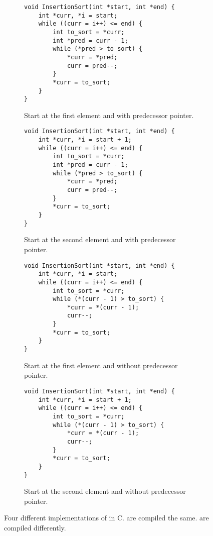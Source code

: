 \begin{figure}
	\lstset{basicstyle=\ttfamily\small}
	\def\codewidth{0.47\linewidth}
	\begin{subfigure}{\codewidth}
		\begin{lstlisting}
void InsertionSort(int *start, int *end) {
	int *curr, *i = start;
	while ((curr = i++) <= end) {
		int to_sort = *curr;
		int *pred = curr - 1;
		while (*pred > to_sort) {
			*curr = *pred;
			curr = pred--;
		}
		*curr = to_sort;
	}
}
		\end{lstlisting}
		\caption{
			Start at the first element and with predecessor pointer.
		}
		\label{fig:insertion:impl:pred_first}
	\end{subfigure}
	\hfill
	\begin{subfigure}{\codewidth}
		\begin{lstlisting}
void InsertionSort(int *start, int *end) {
	int *curr, *i = start + 1;
	while ((curr = i++) <= end) {
		int to_sort = *curr;
		int *pred = curr - 1;
		while (*pred > to_sort) {
			*curr = *pred;
			curr = pred--;
		}
		*curr = to_sort;
	}
}
		\end{lstlisting}
		\caption{
			Start at the second element and with predecessor pointer.
		}
		\label{fig:insertion:impl:pred_sec}
	\end{subfigure}

	\smallskip

	\begin{subfigure}{\codewidth}
		\begin{lstlisting}
void InsertionSort(int *start, int *end) {
	int *curr, *i = start;
	while ((curr = i++) <= end) {
		int to_sort = *curr;
		while (*(curr - 1) > to_sort) {
			*curr = *(curr - 1);
			curr--;
		}
		*curr = to_sort;
	}
}
		\end{lstlisting}
		\caption{
			Start at the first element and without predecessor pointer.
		}
		\label{fig:insertion:impl:offset_first}
	\end{subfigure}
	\hfil
	\begin{subfigure}{\codewidth}
		\begin{lstlisting}
void InsertionSort(int *start, int *end) {
	int *curr, *i = start + 1;
	while ((curr = i++) <= end) {
		int to_sort = *curr;
		while (*(curr - 1) > to_sort) {
			*curr = *(curr - 1);
			curr--;
		}
		*curr = to_sort;
	}
}
		\end{lstlisting}
		\caption{
			Start at the second element and without predecessor pointer.
		}
		\label{fig:insertion:impl:offset_sec}
	\end{subfigure}
	\caption{
		Four different implementations of \IS{} in C.
		 are compiled the same.
		 are compiled differently.
	}
	\label{fig:insertion:impl}
\end{figure}

